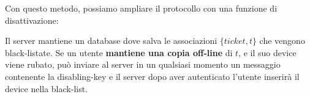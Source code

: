 Con questo metodo, possiamo ampliare il protocollo con una funzione di disattivazione:
\begin{corollary}\label{def:keydis}
Il server mantiene un database dove salva le associazioni $\{ticket,t\}$ che vengono black-listate. Se un utente \textbf{mantiene una copia off-line} di $t$, e il suo device viene rubato, può inviare al server in un qualsiasi momento un messaggio contenente la disabling-key e il server dopo aver autenticato l'utente inserirà il device nella black-list.
\end{corollary}
